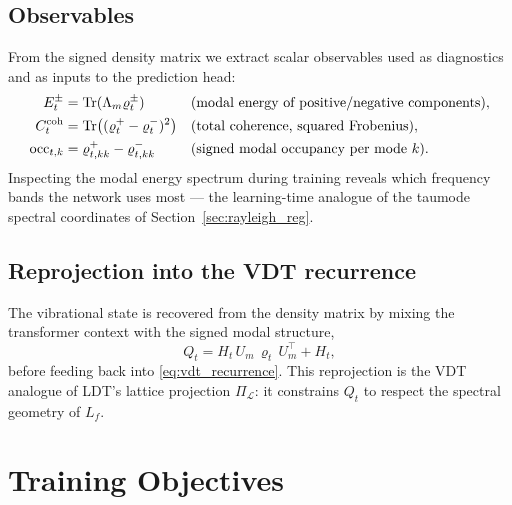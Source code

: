 \documentclass[12pt,a4paper]{article}
\theoremstyle{plain}
\theoremstyle{definition}
\theoremstyle{remark}
\newcommand{\Tr}{\mathrm{Tr}}
\newcommand{\1}{\mathbf{1}}
\newcommand{\VDT}{\textsc{VDT}}
\begin{document}
\subsection{Observables}

From the signed density matrix we extract scalar observables used as
diagnostics and as inputs to the prediction head:
\begin{align}
  E_t^{\pm} &= \Tr(\Lambda_m \varrho_t^{\pm})
    && \text{(modal energy of positive/negative components)}, \\
  C_t^{\rm coh} &= \Tr\bigl((\varrho_t^{+} - \varrho_t^{-})^2\bigr)
    && \text{(total coherence, squared Frobenius)}, \\
  \mathrm{occ}_{t,k} &= \varrho_{t,kk}^{+} - \varrho_{t,kk}^{-}
    && \text{(signed modal occupancy per mode $k$).}
\end{align}
Inspecting the modal energy spectrum during training reveals which
frequency bands the network uses most --- the learning-time analogue of
the taumode spectral coordinates of Section~\ref{sec:rayleigh_reg}.

\subsection{Reprojection into the \VDT{} recurrence}

The vibrational state is recovered from the density matrix by mixing the
transformer context with the signed modal structure,
\begin{equation}
  Q_t = H_t \, U_m \, \varrho_t \, U_m^\top + H_t,
  \label{eq:reprojection}
\end{equation}
before feeding back into \eqref{eq:vdt_recurrence}. This reprojection is
the \VDT{} analogue of \textsc{LDT}'s lattice projection
$\Pi_\mathcal{L}$: it constrains $Q_t$ to respect the spectral geometry
of $L_f$.

\section{Training Objectives}
\label{sec:training}
\end{document}
